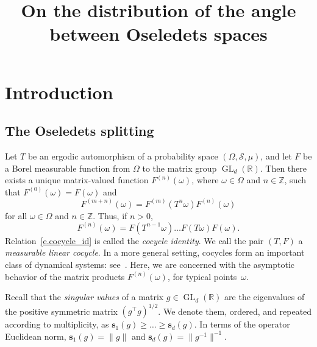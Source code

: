 \documentclass[AHL,Unicode,longabstracts,published]{cedram}
\title[The angle between Oseledets spaces]{On the distribution of the angle between Oseledets spaces}
\author[\initial{J.} \lastname{Bochi}]{\firstname{Jairo} \lastname{Bochi}}
\author[\initial{P.} \lastname{Lessa}]{\firstname{Pablo} \lastname{Lessa}}
\newcommand{\Z}{\mathbb{Z}}
\newcommand{\R}{\mathbb{R}}
\newcommand{\bfs}{\mathbf{s}}
\newcommand{\clS}{\mathcal{S}}
\DeclareMathOperator{\GL}{GL}
\DeclareMathOperator{\GL}{GL}
\newcommand{\R}{\mathbb{R}}
\begin{document}
\maketitle

\section{Introduction}

\subsection{The Oseledets splitting}

Let $T$ be an ergodic automorphism of a probability space $(\Omega,\clS,\mu)$, and let $F$ be a Borel measurable function from $\Omega$ to the matrix group $\GL_d(\R)$. Then there exists a unique matrix-valued function $F^{(n)}(\omega)$, where $\omega \in \Omega$ and $n \in \Z$, such that $F^{(0)}(\omega) = F(\omega)$ and
\begin{equation}\label{e.cocycle_id}
F^{(m+n)}(\omega) = F^{(m)}(T^n \omega) F^{(n)}(\omega)
\end{equation}
for all $\omega \in \Omega$ and $n \in \Z$. Thus, if $n > 0$,
\begin{equation}
F^{(n)}(\omega) = F\left(T^{n-1} \omega\right)\dots F(T\omega) F(\omega).
\end{equation}
Relation~\eqref{e.cocycle_id} is called the \emph{cocycle identity}. We call the pair $(T,F)$ a \emph{measurable linear cocycle}. In a more general setting, cocycles form an important class of dynamical systems: see~\cite[Section~1.3.k]{HK}. Here, we are concerned with the asymptotic behavior of the matrix products $F^{(n)}(\omega)$, for typical points~$\omega$.

Recall that the \emph{singular values} of a matrix $g \in \GL_d(\R)$ are the eigenvalues of the positive symmetric matrix $(g^\top g)^{1/2}$. We denote them, ordered, and repeated according to multiplicity, as $\bfs_1(g) \ge \dots \ge \bfs_d(g)$. In terms of the operator Euclidean norm, $\bfs_1(g) = \|g\|$ and $\bfs_d(g) = \|g^{-1}\|^{-1}$.
\end{document}
